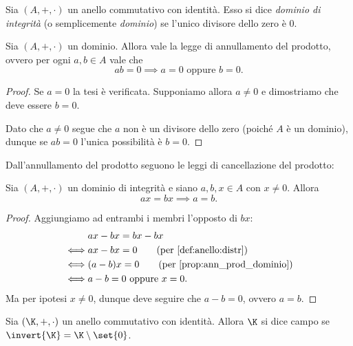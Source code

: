 \begin{definition}
    \label{def:dominio}
    Sia $(A, +, \cdot)$ un anello commutativo con identità. Esso si dice \emph{dominio di integrità} (o semplicemente \emph{dominio}) se l'unico divisore dello zero è $0$.
\end{definition}

\begin{proposition}
    \label{prop:ann_prod_dominio}
    Sia $(A, +, \cdot)$ un dominio. Allora vale la legge di annullamento del prodotto, ovvero per ogni $a, b \in A$ vale che \[
        ab = 0 \implies a = 0 \text{ oppure } b = 0.    
    \]
\end{proposition}
\begin{proof}
    Se $a = 0$ la tesi è verificata. Supponiamo allora $a \neq 0$ e dimostriamo che deve essere $b = 0$.

    Dato che $a \neq 0$ segue che $a$ non è un divisore dello zero (poiché $A$ è un dominio), dunque se $ab = 0$ l'unica possibilità è $b = 0$.
\end{proof}

Dall'annullamento del prodotto seguono le leggi di cancellazione del prodotto:
\begin{corollary}
    \label{cor:canc_prod_dominio}
    Sia $(A, +, \cdot)$ un dominio di integrità e siano $a, b, x \in A$ con $x \neq 0$. Allora \[
        ax = bx \implies a = b.    
    \]
\end{corollary}
\begin{proof}
    Aggiungiamo ad entrambi i membri l'opposto di $bx$: \begin{align*}
        &ax - bx = bx - bx\\
        \iff &ax - bx = 0 \tag{per \ref{def:anello:distr}}\\
        \iff &(a - b)x = 0 \tag{per \ref{prop:ann_prod_dominio}}\\
        \iff &a-b = 0 \text{ oppure } x = 0.
    \end{align*} Ma per ipotesi $x \neq 0$, dunque deve seguire che $a - b = 0$, ovvero $a = b$.
\end{proof}

\begin{definition}
    [Campo]
    Sia $(\K, +, \cdot)$ un anello commutativo con identità. Allora $\K$ si dice campo se $\invert{\K} = \K \setminus \set{0}$.
\end{definition}


